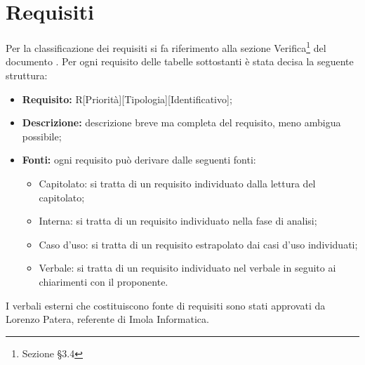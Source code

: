 \section{Requisiti}
Per la classificazione dei requisiti si fa riferimento alla sezione Verifica\footnote{Sezione §3.4} del documento .
Per ogni requisito delle tabelle sottostanti è stata decisa la seguente struttura: 
\begin{itemize}
\item\textbf{Requisito:} R[Priorità][Tipologia][Identificativo];
\item\textbf{Descrizione:} descrizione breve ma completa del requisito, meno ambigua possibile;
\item\textbf{Fonti:} ogni requisito può derivare dalle seguenti fonti:
	\begin{itemize}
		\item Capitolato: si tratta di un requisito individuato dalla lettura del capitolato;
		\item Interna: si tratta di un requisito individuato nella fase di analisi;
		\item Caso d'uso: si tratta di un requisito estrapolato dai casi d'uso individuati;
		\item Verbale: si tratta di un requisito individuato nel verbale in seguito ai chiarimenti con il proponente.
	\end{itemize}
\end{itemize}
I verbali esterni che costituiscono fonte di requisiti sono stati approvati da Lorenzo Patera, referente di Imola Informatica.


